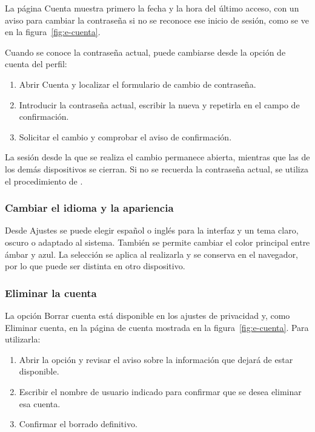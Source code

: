 La página \guillemotleft{}Cuenta\guillemotright{} muestra primero la fecha y la hora del
último acceso, con un aviso para cambiar la contraseña si no se reconoce
ese inicio de sesión, como se ve en la figura~\ref{fig:e-cuenta}.


Cuando se conoce la contraseña actual, puede cambiarse desde la opción de
cuenta del perfil:

\begin{enumerate}
    \item Abrir \guillemotleft{}Cuenta\guillemotright{} y localizar el
    formulario de cambio de contraseña.
    \item Introducir la contraseña actual, escribir la nueva y repetirla
    en el campo de confirmación.
    \item Solicitar el cambio y comprobar el aviso de confirmación.
\end{enumerate}

La sesión desde la que se realiza el cambio permanece abierta, mientras
que las de los demás dispositivos se cierran. Si no se recuerda la
contraseña actual, se utiliza el procedimiento de
\guillemotleft{}\guillemotright{}.

\subsubsection{Cambiar el idioma y la apariencia}

Desde \guillemotleft{}Ajustes\guillemotright{} se puede elegir español o
inglés para la interfaz y un tema claro, oscuro o adaptado al sistema.
También se permite cambiar el color principal entre ámbar y azul. La
selección se aplica al realizarla y se conserva en el navegador, por lo que
puede ser distinta en otro dispositivo.

\subsubsection{Eliminar la cuenta}

La opción \guillemotleft{}Borrar cuenta\guillemotright{} está disponible
en los ajustes de privacidad y, como \guillemotleft{}Eliminar cuenta\guillemotright{},
en la página de cuenta mostrada en la figura~\ref{fig:e-cuenta}. Para
utilizarla:

\begin{enumerate}
    \item Abrir la opción y revisar el aviso sobre la información que
    dejará de estar disponible.
    \item Escribir el nombre de usuario indicado para confirmar que se
    desea eliminar esa cuenta.
    \item Confirmar el borrado definitivo.
\end{enumerate}

